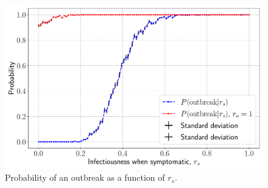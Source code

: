 \begin{figure}[htb]
	\centering
	\includegraphics[width=0.8\columnwidth]{../fig/2Cb_probs.pdf}
	\caption{Probability of an outbreak as a function of $r_s$.}
	\label{fig:rs_prob}
\end{figure}


\clearpage